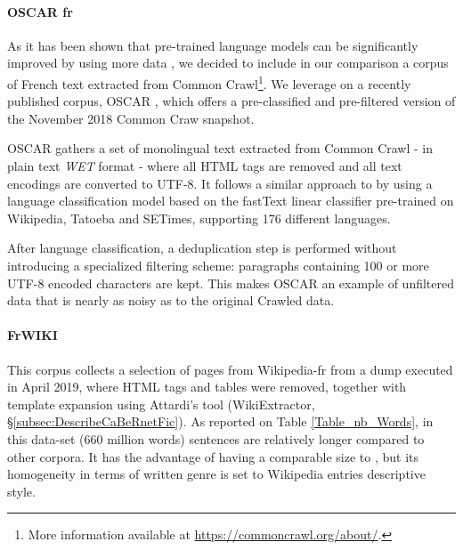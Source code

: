 \paragraph{OSCAR fr}
As it has been shown that pre-trained language models can be significantly improved by using more data \citep{liu-etal-2019-roberta,raffel-etal-2020-exploring}, we decided to include in our comparison a corpus of French text extracted from Common Crawl\footnote{More information available  at \url{https://commoncrawl.org/about/}.}. We leverage on a recently published corpus, OSCAR \citep{ortiz-suarez-etal-2019-asynchronous}, which offers a pre-classified and pre-filtered version of the November 2018 Common Craw snapshot.

OSCAR gathers a set of monolingual text extracted from Common Crawl - in plain text \emph{WET} format - where all HTML tags are removed and all text encodings are converted to UTF-8. It follows a similar approach to \citep{grave-etal-2018-learning} by using a language classification model based on the fastText linear classifier \citep{joulin-etal-2016-fasttext,joulin-etal-2017-bag} pre-trained on Wikipedia, Tatoeba and SETimes, supporting 176 different languages.

After language classification, a deduplication step is performed without introducing a specialized filtering scheme: paragraphs containing 100 or more UTF-8 encoded characters are kept. This makes OSCAR an example of unfiltered data that is nearly as noisy as to the original Crawled data.%


\paragraph{FrWIKI}
This corpus collects a selection of pages from Wikipedia-fr from a dump executed in April 2019, where HTML tags and tables were removed, together with template expansion using Attardi's tool (WikiExtractor, §\ref{subsec:DescribeCaBeRnetFic}). As reported on Table \ref{Table_nb_Words}, in this data-set (660 million words) sentences are relatively longer compared to other corpora. It has the advantage of having a comparable size to \Cabernet, but its homogeneity in terms of written genre is set to Wikipedia entries descriptive style.

